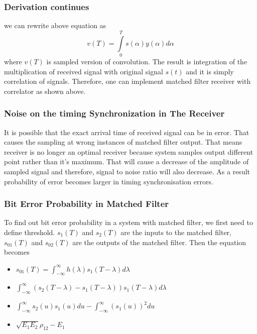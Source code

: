 \documentclass{beamer}
\begin{document}
\begin{frame}
	\frametitle{ Derivation continues}
we can rewrite above equation as
$$v(T)=\int\limits^T_0s(\alpha)y(\alpha)d\alpha$$
where $v(T)$ is sampled version of convolution. The result is integration of the multiplication of received signal with original signal $s(t)$ and it is simply correlation of signals. Therefore, one can implement matched filter receiver with correlator as shown above. 

\end{frame}

\begin{frame}
	\frametitle{Noise on the timing Synchronization in The Receiver}
It is possible that the exact arrival time of received signal can be in error. That causes the sampling at wrong instances of matched filter output. That means receiver is no longer an optimal receiver because system samples output different point rather than it's maximum. That will cause a decrease of the amplitude of sampled signal and therefore, signal to noise ratio will also decrease. As a result probability of error becomes larger in timing synchronisation errors. 
\end{frame}

\begin{frame}
	\frametitle{Bit Error Probability in Matched Filter}
To find out bit error probability in a system with matched filter, we first need to define threshold. $s_1(T)$ and $s_2(T)$ are the inputs to the matched filter, $s_{01}(T)$ and $s_{02}(T)$ are the outputs of the matched filter. Then the equation becomes
\begin{itemize}
	\item $s_{01}(T)=\int_{-\infty}^{\infty} h(\lambda) s_1(T-\lambda) d \lambda $
    	\item $ \int_{-\infty}^{\infty} ( s_2(T-\lambda) - s_1(T-\lambda)) s_1(T-\lambda) d \lambda $
	\item  $\int_{-\infty}^{\infty} s_2(u) s_1(u) du - \int_{-\infty}^{\infty} (s_1(u))^2 du $
    	\item $ \sqrt{E_1 E_2} \rho_{12} - E_1 $
\end{itemize}

\end{frame}
\end{document}
